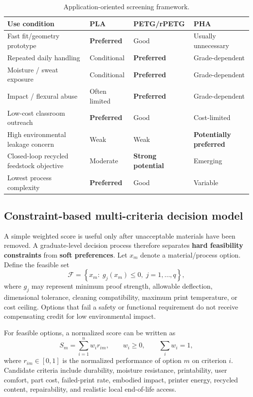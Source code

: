 \documentclass[11pt]{article}
\begin{document}
\begin{table}[htbp]
\centering
\small
\caption{Application-oriented screening framework.}
\begin{tabularx}{\textwidth}{@{}p{}YYY@{}}
\toprule
\textbf{Use condition} & \textbf{PLA} & \textbf{PETG/rPETG} & \textbf{PHA} \\
\midrule
Fast fit/geometry prototype & \textbf{Preferred} & Good & Usually unnecessary \\
Repeated daily handling & Conditional & \textbf{Preferred} & Grade-dependent \\
Moisture / sweat exposure & Conditional & \textbf{Preferred} & Grade-dependent \\
Impact / flexural abuse & Often limited & \textbf{Preferred} & Grade-dependent \\
Low-cost classroom outreach & \textbf{Preferred} & Good & Cost-limited \\
High environmental leakage concern & Weak & Weak & \textbf{Potentially preferred} \\
Closed-loop recycled feedstock objective & Moderate & \textbf{Strong potential} & Emerging \\
Lowest process complexity & \textbf{Preferred} & Good & Variable \\
\bottomrule
\end{tabularx}
\end{table}

\subsection{Constraint-based multi-criteria decision model}

A simple weighted score is useful only after unacceptable materials have been removed. A graduate-level decision process therefore separates \textbf{hard feasibility constraints} from \textbf{soft preferences}. Let $x_m$ denote a material/process option. Define the feasible set
\begin{equation}
\mathcal{F}=\left\{x_m:\; g_j(x_m)\leq 0,\;j=1,\ldots,q\right\},
\end{equation}
where $g_j$ may represent minimum proof strength, allowable deflection, dimensional tolerance, cleaning compatibility, maximum print temperature, or cost ceiling. Options that fail a safety or functional requirement do not receive compensating credit for low environmental impact.

For feasible options, a normalized score can be written as
\begin{equation}
S_m = \sum_{i=1}^{n} w_i r_{im}, \qquad w_i\geq0,\qquad \sum_i w_i=1,
\end{equation}
where $r_{im}\in[0,1]$ is the normalized performance of option $m$ on criterion $i$. Candidate criteria include durability, moisture resistance, printability, user comfort, part cost, failed-print rate, embodied impact, printer energy, recycled content, repairability, and realistic local end-of-life access.
\end{document}
